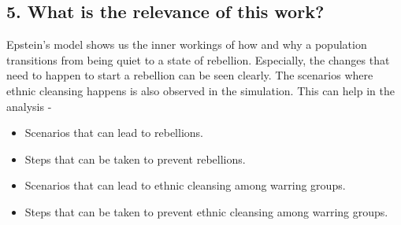 \documentclass[a4paper,11pt]{article}
\begin{document}
\subsection*{5. What is the relevance of this work?}
    Epstein's model shows us the inner workings of how and why a population transitions from being quiet to a state of rebellion. Especially, the changes that need to happen to start a rebellion can be seen clearly. The scenarios where ethnic cleansing happens is also observed in the simulation. This can help in the analysis - 
    \begin{itemize}
        \item Scenarios that can lead to rebellions.
        \item Steps that can be taken to prevent rebellions.
        \item Scenarios that can lead to ethnic cleansing among warring groups.
        \item Steps that can be taken to prevent ethnic cleansing among warring groups.
    \end{itemize} 
\end{document}

